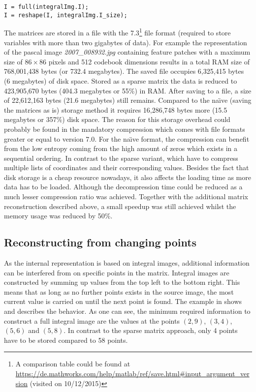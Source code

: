 \begin{lstlisting}[firstnumber=29,caption={Sparse reconstruction by \MATLAB (getCodebookIntegrals.m)},label=lst:reconstruct_sparse_matlab]
I = full(integralImg.I);
I = reshape(I, integralImg.I_size);
\end{lstlisting}

The matrices are stored in a \MATLAB file with the 7.3\footnote{A comparison table could be found at \url{https://de.mathworks.com/help/matlab/ref/save.html\#input_argument_version} (visited on 10/12/2015)} file format (required to store variables with more than two gigabytes of data).
For example the representation of the pascal image \textit{2007\_008932.jpg} containing feature patches with a maximum size of $86\times86$ pixels and 512 codebook dimensions results in a total \ac{RAM} size of 768,001,438 bytes (or 732.4 megabytes). The saved \MATLAB file occupies 6,325,415 bytes (6 megabytes) of disk space.
Stored as a sparse matrix the data is reduced to 423,905,670 bytes (404.3 megabytes or 55\%) in \ac{RAM}. After saving to a file, a size of 22,612,163 bytes (21.6 megabytes) still remains. Compared to the na\"{\i}ve (saving the matrices as is) storage method it requires 16,286,748 bytes more (15.5 megabytes or 357\%) disk space. The reason for this storage overhead could probably be found in the mandatory compression which comes with file formats greater or equal to version 7.0. For the na\"{\i}ve format, the compression can benefit from the low entropy coming from the high amount of zeros which exists in a sequential ordering. In contrast to the sparse variant, which have to compress multiple lists of coordinates and their corresponding values. Besides the fact that disk storage is a cheap resource nowadays, it also affects the loading time as more data has to be loaded. Although the decompression time could be reduced as a much lesser compression ratio was achieved. Together with the additional matrix reconstruction described above, a small speedup was still achieved whilst the memory usage was reduced by 50\%.

\subsection{Reconstructing from changing points}

As the internal representation is based on integral images, additional information can be interfered from on specific points in the matrix. Integral images are constructed by summing up values from the top left to the bottom right. This means that as long as no further points exists in the source image, the most current value is carried on until the next point is found. The example in  shows and describes the behavior. As one can see, the minimum required information to construct a full integral image are the values at the points $(2,9)$, $(3,4)$, $(5,6)$ and $(5,8)$. In contrast to the sparse matrix approach, only 4 points have to be stored compared to 58 points.

